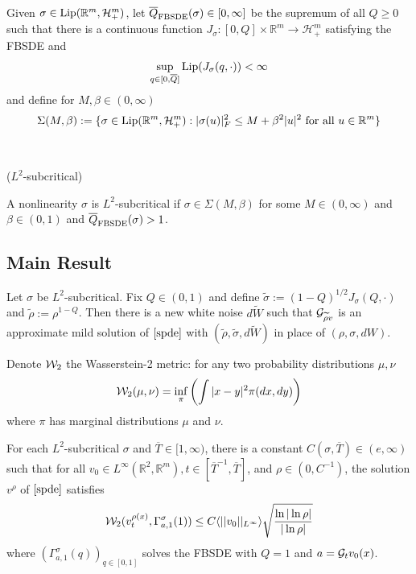 \begin{definition}
    Given $\sigma \in \text{Lip}(\mathbb{R}^m,\mathcal{H}_+^m)$, let $\overline{Q}_{\text{FBSDE}}(\sigma) \in [0,\infty]$ be the supremum of all $Q\geq 0$ such that there is a continuous function $J_{\sigma}:[0,Q]\times\mathbb{R}^m \to \mathcal{H}_+^m$ satisfying the FBSDE and
    \[\sup_{q\in[0,\overline{Q}]} \text{Lip}(J_{\sigma}(q,\cdot)) < \infty\]
    and define for $M,\beta \in (0,\infty)$
    \[\Sigma(M,\beta):=\{\sigma\in\text{Lip}(\mathbb{R}^m,\mathcal{H}_+^m):|\sigma(u)|_F^2 \leq M+\beta^2|u|^2\text{ for all }u\in\mathbb{R}^m\}\]
\end{definition}

\begin{definition}\ \par
    ($L^2$-subcritical)\par
    A nonlinearity $\sigma$ is $L^2$-subcritical if $\sigma \in \Sigma(M,\beta)$ for some $M\in (0,\infty)$ and $\beta\in(0,1)$ and $\overline{Q}_{\text{FBSDE}}(\sigma)>1$.
\end{definition}

\subsection{Main Result}

\begin{theorem}
    Let $\sigma$ be $L^2$-subcritical. Fix $Q \in (0,1)$ and define $\tilde{\sigma}:=(1-Q)^{1/2}J_{\sigma}(Q,\cdot)$ and $\widetilde{\rho}:=\rho^{1-Q}$. Then there is a new white noise $d\widetilde{W}$ such that $\mathcal{G}_{\widetilde{\rho}v}$ is an approximate mild solution of $\eqref{spde}$ with $(\widetilde{\rho},\widetilde{\sigma},d\widetilde{W})$ in place of $(\rho,\sigma,dW)$.
\end{theorem}

\begin{definition}
    Denote $\mathcal{W}_2$ the Wasserstein-2 metric: for any two probability distributions $\mu,\nu$
    \[\mathcal{W}_2(\mu,\nu)  = \inf_{\pi} \left(\int |x-y|^2\pi(dx,dy)\right)\]
    where $\pi$ has marginal distributions $\mu$ and $\nu$.\par
\end{definition}

\begin{theorem}
    For each $L^2$-subcritical $\sigma$ and $\overline{T} \in [1,\infty)$, there is a constant $C(\sigma,\overline{T}) \in (e,\infty)$ such that for all $v_0 \in L^{\infty}(\mathbb{R}^2,\mathbb{R}^m),t\in[\overline{T}^{-1},\overline{T}]$, and $\rho \in (0,C^{−1})$, the solution $v^{\rho}$ of $\eqref{spde}$ satisfies
    \[
    \mathcal{W}_2(v_t^{\rho(x)},\Gamma^{\sigma}_{a,1}(1)) \leq C\langle ||v_0||_{L^{\infty}}\rangle \sqrt{\dfrac{\ln|\ln\rho|}{|\ln\rho|}}
    \]
    where $(\Gamma^{\sigma}_{a,1}(q))_{q\in[0,1]}$ solves the FBSDE with $Q = 1$ and $a = \mathcal{G}_tv_0(x)$.
\end{theorem}
